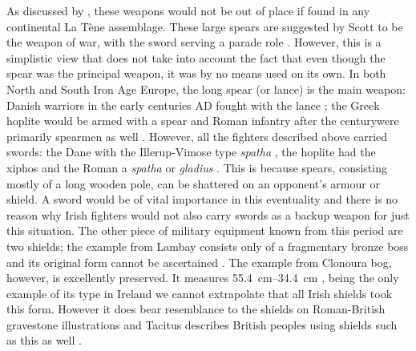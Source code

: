As discussed by \textcite[65]{Scott1990}, these weapons would not be out of place if found in any continental La Tène assemblage. 
These large spears are suggested by Scott to be the weapon of war, with the sword serving a parade role \parencite[c.f.][45\psqq]{Lejars2007}. 
However, this is a simplistic view that does not take into account the fact that even though the spear was the principal weapon, it was by no means used on its own. 
In both North and South Iron Age Europe, the long spear (or lance) is the main weapon:
 Danish warriors in the early centuries AD fought with the lance \parencite{Hvid2007}; the Greek hoplite would be armed with a spear \parencite[6]{Goldsworthy1997} and Roman infantry after the  century\AD were primarily spearmen as well \parencite[61]{Stephenson1999}. 
 However, all the fighters described above carried swords: the Dane with the Illerup-Vimose type \emph{spatha} \parencite[139]{Hvid2007}, 
 the hoplite had the xiphos \parencite[23]{Anderson1993} and the Roman a \emph{spatha} or \emph{gladius} \parencite[58]{Stephenson1999}. 
 This is because spears, consisting mostly of a long wooden pole, can be shattered on an opponent’s armour or shield. 
 A sword would be of vital importance in this eventuality and there is no reason why Irish fighters would not also carry swords as a backup weapon for just this situation.
The other piece of military equipment known from this period are two shields; 
the example from Lambay consists only of a fragmentary bronze boss and its original form cannot be ascertained \parencites[107]{Raftery1983}[see also][chapter 4]{CahillWilson2014}. 
The example from Clonoura bog, however, is excellently preserved. 
It measures \SIrange[range-phrase=$\times$]{55.4}{34.4}{\cm} \parencite[1007]{Raftery1983}, 
being the only example of its type in Ireland we cannot extrapolate that all Irish shields took this form. 
However it does bear resemblance to the shields on Roman-British gravestone illustrations and Tacitus describes British peoples using shields such as this as well \parencites[313]{Coulston2006}[71]{Coulston2014}. 


